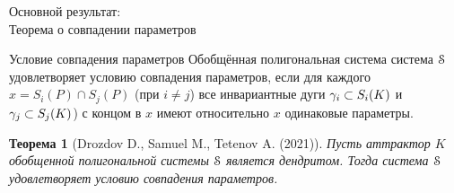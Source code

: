 \documentclass[aspectratio=1610, 10pt, notheorems]{beamer}
\newtheorem{theorem}     {Теорема}
\newtheorem{lemma}       {Лемма}
\newtheorem{definition}  {Определение}
\begin{document}
%
%



\begin{frame}{Основной результат:\\Теорема о совпадении параметров}
\begin{block}{Условие совпадения параметров}
Обобщённая полигональная система система ${\EuScript S}$ удовлетворяет условию совпадения параметров, если для каждого $x=S_i(P)\cap S_j(P)$ (при $i\neq j$) все инвариантные дуги $\gamma_i\subset S_i(K)$ и $\gamma_j\subset S_j(K)$) с концом в $x$ имеют относительно $x$ одинаковые параметры.
\end{block}
\begin{theorem}[Drozdov D., Samuel M., Tetenov A. (2021)]
Пусть аттрактор $K$ обобщенной полигональной системы ${\EuScript S}$ является дендритом. 
Тогда система ${\EuScript S}$ удовлетворяет условию совпадения параметров.
\end{theorem}
\end{frame}

\end{document}
